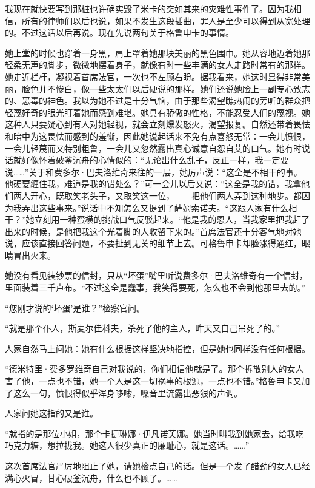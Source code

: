 \par 我现在就快要写到那桩也许确实毁了米卡的突如其来的灾难性事件了。因为我相信，所有的律师们以后也说，如果不发生这段插曲，罪人是至少可以得到从宽处理的。不过这话以后再说。现在先说两句关于格鲁申卡的事情。
\par 她上堂的时候也穿着一身黑，肩上罩着她那块美丽的黑色围巾。她从容地迈着她那轻柔无声的脚步，微微地摆着身子，就像有时一些丰满的女人走路时常有的那样。她走近栏杆，凝视着首席法官，一次也不左顾右盼。据我看来，她这时显得非常美丽，脸色并不惨白，像一些太太们以后硬说的那样。她们还说她脸上一副专心致志的、恶毒的神色。我以为她不过是十分气恼，由于那些渴望瞧热闹的旁听的群众把轻蔑好奇的眼光盯着她而感到难堪。她具有骄傲的性格，不能忍受人们的蔑视。她这种人只要疑心到有人对她轻视，就会立刻爆发怒火，渴望报复。自然还带着畏怯和暗中为这畏怯而感到的羞惭，因此她说起话来不免有点喜怒无常：一会儿愤恨，一会儿轻蔑而又特别粗鲁，一会儿又忽然露出真心诚意自怨自艾的口气。她有时说话就好像怀着破釜沉舟的心情似的：“无论出什么乱子，反正一样，我一定要说……”关于和费多尔·巴夫洛维奇来往的一层，她厉声说：“这全是不相干的事。他硬要缠住我，难道是我的错处么？”可一会儿以后又说：“这全是我的错，我拿他们两人开心，既取笑老头子，又取笑这一位，——把他们两人弄到这种地步。都因为我弄出这些事来。”说话中不知怎么又提到了萨姆索诺夫。“这跟人家有什么相干？”她立刻用一种蛮横的挑战口气反驳起来。“他是我的恩人，当我家里把我赶了出来的时候，是他把我这个光着脚的人收留下来的。”首席法官还十分客气地对她说，应该直接回答问题，不要扯到无关的细节上去。可格鲁申卡却脸涨得通红，眼睛冒出火来。
\par 她没有看见装钞票的信封，只从“坏蛋”嘴里听说费多尔·巴夫洛维奇有一个信封，里面装着三千卢布。“不过这全是蠢事，我笑得要死，怎么也不会到他那里去的。”
\par “您刚才说的‘坏蛋’是谁？”检察官问。
\par “就是那个仆人，斯麦尔佳科夫，杀死了他的主人，昨天又自己吊死了的。”
\par 人家自然马上问她：她有什么根据这样坚决地指控，但是她也同样没有任何根据。
\par “德米特里·费多罗维奇自己对我说的，你们相信他就是了。那个拆散别人的女人害了他，一点也不错，她一个人是这一切祸事的根源，一点也不错。”格鲁申卡又加了这么一句，愤恨得似乎浑身哆嗦，嗓音里流露出恶狠的声调。
\par 人家问她这指的又是谁。
\par “就指的是那位小姐，那个卡捷琳娜·伊凡诺芙娜。她当时叫我到她家去，给我吃巧克力糖，想拉拢我。她这人很少真正的廉耻心，就是这话。……”
\par 这次首席法官严厉地阻止了她，请她检点自己的话。但是一个发了醋劲的女人已经满心火冒，甘心破釜沉舟，什么也不顾了。……
